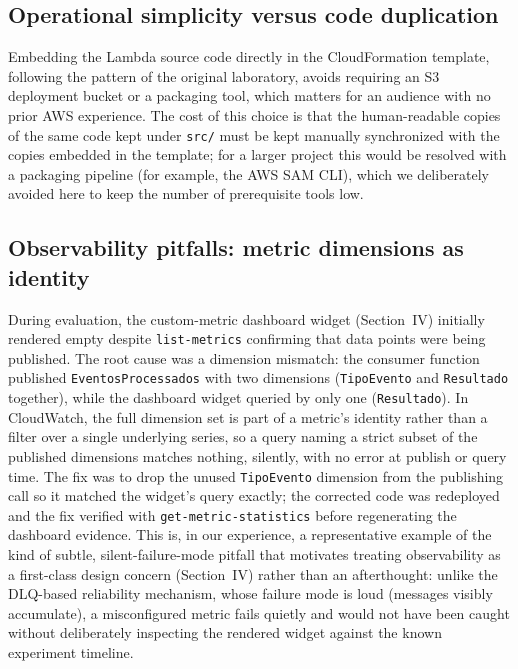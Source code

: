 \documentclass[conference]{IEEEtran}
\begin{document}
\subsection{Operational simplicity versus code duplication}
Embedding the Lambda source code directly in the CloudFormation template, following the pattern of the original laboratory, avoids requiring an S3 deployment bucket or a packaging tool, which matters for an audience with no prior AWS experience. The cost of this choice is that the human-readable copies of the same code kept under \texttt{src/} must be kept manually synchronized with the copies embedded in the template; for a larger project this would be resolved with a packaging pipeline (for example, the AWS SAM CLI), which we deliberately avoided here to keep the number of prerequisite tools low.

\subsection{Observability pitfalls: metric dimensions as identity}
During evaluation, the custom-metric dashboard widget (Section~IV) initially rendered empty despite \texttt{list-metrics} confirming that data points were being published. The root cause was a dimension mismatch: the consumer function published \texttt{EventosProcessados} with two dimensions (\texttt{TipoEvento} and \texttt{Resultado} together), while the dashboard widget queried by only one (\texttt{Resultado}). In CloudWatch, the full dimension set is part of a metric's identity rather than a filter over a single underlying series, so a query naming a strict subset of the published dimensions matches nothing, silently, with no error at publish or query time. The fix was to drop the unused \texttt{TipoEvento} dimension from the publishing call so it matched the widget's query exactly; the corrected code was redeployed and the fix verified with \texttt{get-metric-statistics} before regenerating the dashboard evidence. This is, in our experience, a representative example of the kind of subtle, silent-failure-mode pitfall that motivates treating observability as a first-class design concern (Section~IV) rather than an afterthought: unlike the DLQ-based reliability mechanism, whose failure mode is loud (messages visibly accumulate), a misconfigured metric fails quietly and would not have been caught without deliberately inspecting the rendered widget against the known experiment timeline.
\end{document}
